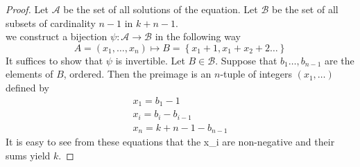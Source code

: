\documentclass[../main.tex]{subfiles}
\begin{document}
\begin{proof}
Let $ \mathcal{A}$ be the set of all solutions of the equation.
Let  $\mathcal{B}$ be the set of all subsets of cardinality $n-1$  in $k+n-1$.\\
we construct a bijection $\psi: \mathcal{A} \to \mathcal{B}$ in the following way
\[ 
	A = ( x_1, \ldots, x_n ) \mapsto B = \left\{ x_1 +1, x_1+x_2 +2 \ldots \right\} 
\]
It suffices to show that $\psi$ is invertible.
Let $B \in \mathcal{B}$.
Suppose that $b_1 \ldots, b_{n-1}$ are the elements of $B$, ordered.
Then the preimage is an $n$-tuple of integers $( x_1, \ldots) $ defined by
\begin{align*}
x_1 = b_1 -1\\
x_i = b_i - b_{i-1}\\
x_n = k+n-1 - b_{n-1} 
\end{align*}
It is easy to see from these equations that the x_i are non-negative and their sums yield $k$.



\end{proof}




	
\end{document}
